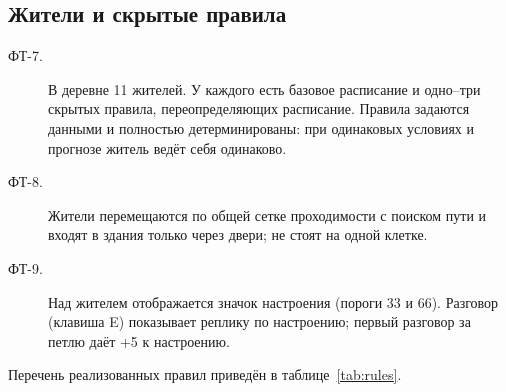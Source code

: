 \documentclass[12pt]{article}
\begin{document}
\subsection{Жители и скрытые правила}
\begin{description}
\item[ФТ-7.] В деревне 11 жителей. У каждого есть базовое расписание и одно–три скрытых правила, переопределяющих расписание. Правила задаются данными и полностью детерминированы: при одинаковых условиях и прогнозе житель ведёт себя одинаково.
\item[ФТ-8.] Жители перемещаются по общей сетке проходимости с поиском пути и входят в здания только через двери; не стоят на одной клетке.
\item[ФТ-9.] Над жителем отображается значок настроения (пороги 33 и 66). Разговор (клавиша E) показывает реплику по настроению; первый разговор за петлю даёт +5 к настроению.
\end{description}
Перечень реализованных правил приведён в таблице~\ref{tab:rules}.
\end{document}
